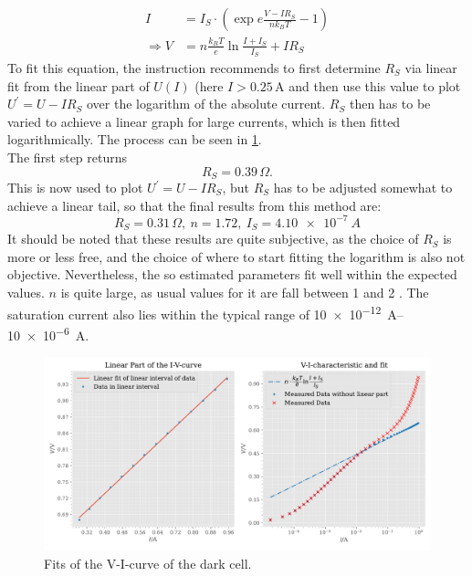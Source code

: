 \documentclass[english,  %
parskip=full,  %
headsepline]{scrartcl}
\begin{document}
\begin{align}
    I&=I_S\cdot\left(\exp{e\frac{V-IR_S}{nk_BT}}-1\right)\\
    \Rightarrow V&=n\frac{k_BT}{e}\ln{\frac{I+I_S}{I_S}}+IR_S\label{eq:vdepend}
\end{align}
To fit this equation, the instruction recommends to first determine $R_S$ via linear fit from the linear part of $U(I)$ (here $I>0.25$\,A and then use this value to plot $U^\prime=U-IR_S$ over the logarithm of the absolute current. $R_S$ then has to be varied to achieve a linear graph for large currents, which is then fitted logarithmically. The process can be seen in \cref{fig:A_fit}.\\
The first step returns 
\[R_S=0.39\,\Omega.\]
This is now used to plot $U^\prime=U-IR_S$, but $R_S$ has to be adjusted somewhat to achieve a linear tail, so that the final results from this method are:
\[R_S=0.31\,\Omega,\:
n=1.72,\:
I_S=\SI{4.10e-7}{A}
\]
It should be noted that these results are quite subjective, as the choice of $R_S$ is more or less free, and the choice of where to start fitting the logarithm is also not objective. Nevertheless, the so estimated parameters fit well within the expected values. $n$ is quite large, as usual values for it are fall between 1 and 2 \cite{pved}. The saturation current also lies within the typical range of \SIrange{10e-12}{10e-6}{A}.
\begin{figure}[H]
    \centering
    \includegraphics[width=\linewidth]{Afit.pdf}
    \caption{Fits of the V-I-curve of the dark cell.}
    \label{fig:A_fit}
\end{figure}
\end{document}
